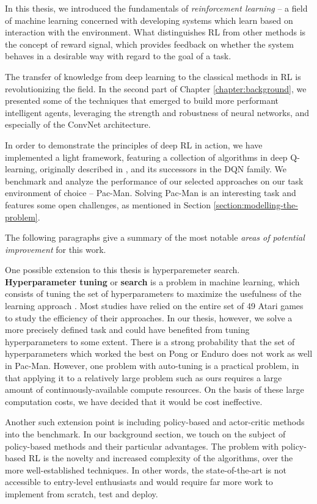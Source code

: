 In this thesis, we introduced the fundamentals of \emph{reinforcement learning} -- a field of machine learning concerned with developing systems which learn based on interaction with the environment.
What distinguishes RL from other methods is the concept of reward signal, which provides feedback on whether the system behaves in a desirable way with regard to the goal of a task.

The transfer of knowledge from deep learning to the classical methods in RL is revolutionizing the field.
In the second part of Chapter \ref{chapter:background}, we presented some of the techniques that emerged to build more performant intelligent agents, leveraging the strength and robustness of neural networks, and especially of the ConvNet architecture.

In order to demonstrate the principles of deep RL in action, we have implemented a light framework, featuring a collection of algorithms in deep Q-learning, originally described in \cite{atari-dqn}, and its successors in the DQN family.
We benchmark and analyze the performance of our selected approaches on our task environment of choice -- Pac-Man. Solving Pac-Man is an interesting task and features some open challenges, as mentioned in Section \ref{section:modelling-the-problem}.

The following paragraphs give a summary of the most notable \emph{areas of potential improvement} for this work.

One possible extension to this thesis is hyperparemeter search.
\textbf{Hyperparameter tuning} or \textbf{search} is a problem in machine learning, which consists of tuning the set of hyperparameters to maximize the usefulness of the learning approach \cite{hyperparam-search-paper}.
Most studies have relied on the entire set of 49 Atari games to study the efficiency of their approaches.
In our thesis, however, we solve a more precisely defined task and could have benefited from tuning hyperparameters to some extent.
There is a strong probability that the set of hyperparameters which worked the best on Pong or Enduro does not work as well in Pac-Man.
However, one problem with auto-tuning is a practical problem, in that applying it to a relatively large problem such as ours requires a large amount of continuously-available compute resources.
On the basis of these large computation costs, we have decided that it would be cost ineffective.

Another such extension point is including policy-based and actor-critic methods into the benchmark.
In our background section, we touch on the subject of policy-based methods and their particular advantages.
The problem with policy-based RL is the novelty and increased complexity of the algorithms, over the more well-established techniques.
In other words, the state-of-the-art is not accessible to entry-level enthusiasts and would require far more work to implement from scratch, test and deploy.

